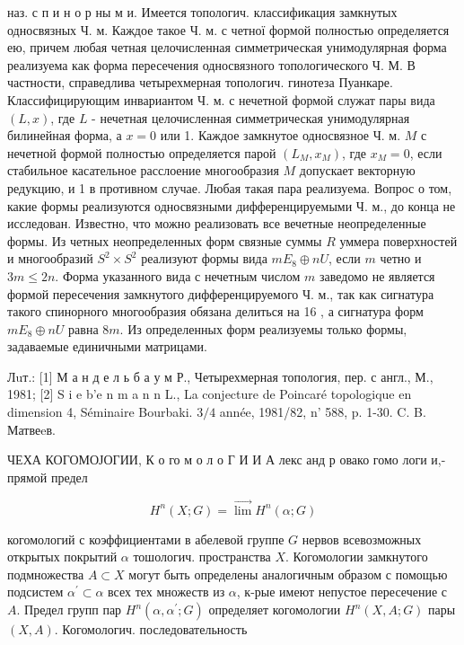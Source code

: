 \documentclass[10pt]{article}
\begin{document}
наз. с п и н о р ны м и. Имеется топологич. классификация замкнутых односвязных Ч. м. Каждое такое Ч. м. с четної формой полностью определяется ею, причем любая четная целочисленная симметрическая унимодулярная форма реализуема как форма пересечения односвязного топологического Ч. М. В частности, справедлива четырехмерная топологич. гинотеза Пуанкаре. Классифицирующим инвариантом Ч. м. с нечетной формой служат пары вида $(L, x)$, где $L$ - нечетная целочисленная симметрическая унимодулярная билинейная форма, а $x=0$ или 1. Каждое замкнутое односвязное Ч. м. $M$ с нечетной формой полностью определяется парой $\left(L_{M}, x_{M}\right)$, где $x_{M}=0$, если стабильное касательное расслоение многообразия $M$ допускает векторную редукцию, и 1 в противном случае. Любая такая пара реализуема. Вопрос о том, какие формы реализуются односвязными дифференцируемыми Ч. м., до конца не исследован. Известно, что можно реализовать все вечетные неопределенные формы. Из четных неопределенных форм связные суммы $R$ уммера поверхностей и многообразий $S^{2} \times S^{2}$ реализуют формы вида $m E_{8} \oplus n U$, если $m$ четно и $3 m \leqslant 2 n$. Форма указанного вида с нечетным числом $m$ заведомо не является формой пересечения замкнутого дифференцируемого Ч. м., так как сигнатура такого спинорного многообразия обязана делиться на 16 , а сигнатура форм $m E_{8} \oplus n U$ равна $8 m$. Из определенных форм реализуемы только формы, задаваемые единичными матрицами.



Лuт.: [1] М а н д е л ь б а у м Р., Четырехмерная топология, пер. с англ., М., 1981; [2] S i e b'e n m a n n L., La conjecture de Poincaré topologique en dimension 4, Séminaire Bourbaki. $3 / 4$ année, 1981/82, n' 588, p. 1-30. C. B. Матвеeв.



ЧЕХА КОГОМОЈОГИИ, К о го м о л о Г И И А лекс анд р овако гомо логи и,- прямой предел



\[

H^{n}(X ; G)=\lim ^{\longrightarrow} H^{n}(\alpha ; G)

\]



когомологий с коэффициентами в абелевой группе $G$ нервов всевозможных открытых покрытий $\alpha$ тошологич. пространства $X$. Когомологии замкнутого подмножества $A \subset X$ могут быть определены аналогичным образом с помощью подсистем $\alpha^{\prime} \subset \alpha$ всех тех множеств из $\alpha$, к-рые имеют непустое пересечение с $A$. Предел групп пар $H^{n}\left(\alpha, \alpha^{\prime} ; G\right)$ определяет когомологии $H^{n}(X, A ; G)$ пары $(X, A)$. Когомологич. последовательность
\end{document}

